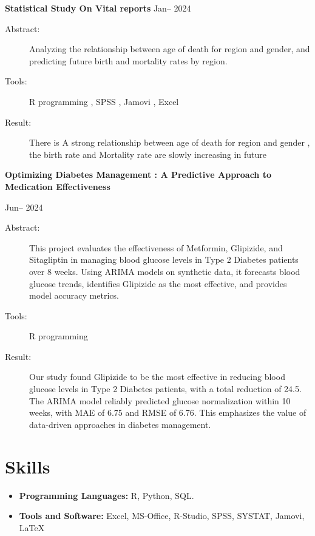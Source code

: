 \documentclass[a4paper,11pt]{article}
\begin{document}
	\noindent
	{\textbf{Statistical Study On Vital reports} \hfill Jan-- 2024 \\}
	\begin{description}
		\item[Abstract:] Analyzing the relationship between age of death for region and gender, and predicting future birth and mortality rates by region.
		\item[Tools:] R programming , SPSS , Jamovi , Excel
		\item[Result:] There is A strong relationship between age of death for region and gender , the birth rate and Mortality rate are slowly increasing in future\\
		\linebreak[2mm]
	\end{description}
	\textbf{Optimizing Diabetes Management : A Predictive Approach to Medication Effectiveness}
	\begin{flushright}
		 \hfill Jun-- 2024 \\
	\end{flushright}
	\begin{description}
		\item[Abstract:] This project evaluates the effectiveness of Metformin, Glipizide, and Sitagliptin in managing blood glucose levels in Type 2 Diabetes patients over 8 weeks. Using ARIMA models on synthetic data, it forecasts blood glucose trends, identifies Glipizide as the most effective, and provides model accuracy metrics.
		\item[Tools:] R programming 
		\item[Result:] Our study found Glipizide to be the most effective in reducing blood glucose levels in Type 2 Diabetes patients, with a total reduction of 24.5. The ARIMA model reliably predicted glucose normalization within 10 weeks, with MAE of 6.75 and RMSE of 6.76. This emphasizes the value of data-driven approaches in diabetes management.
		
		
	\end{description}


	\section*{Skills}
	\begin{itemize}
		\item \textbf{Programming Languages:}  R, Python, SQL.
		\item \textbf{Tools and Software:} Excel, MS-Office,
		R-Studio, SPSS, SYSTAT, Jamovi, \LaTeX
		
	\end{itemize}
\end{document}
